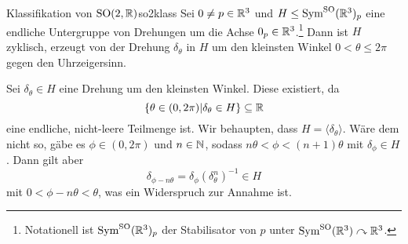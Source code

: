 \begin{lemma}{Klassifikation von $\text{SO}(2,\mathbb{R})$}{so2klass}
Sei $0 \neq p \in \mathbb{R}^3$ und $H \leq \text{Sym}^\text{SO} (\mathbb{R}^3)_p$ eine endliche Untergruppe von Drehungen um die Achse $0_p \in \mathbb{R}^3$.\footnote{Notationell ist $\text{Sym}^\text{SO} (\mathbb{R}^3)_p$ der Stabilisator von $p$ unter $\text{Sym}^\text{SO} (\mathbb{R}^3) \curvearrowright \mathbb{R}^3$.} Dann ist $H$ zyklisch, erzeugt von der Drehung $\delta_\theta$ in $H$ um den kleinsten Winkel $0<\theta \leq 2\pi$ gegen den Uhrzeigersinn.
\end{lemma}
\begin{beweis}
Sei $\delta_\theta \in H$ eine Drehung um den kleinsten Winkel. Diese existiert, da 
\begin{equation}
\{\theta \in (0,2\pi)|\delta_\theta \in H\} \subseteq \mathbb{R}
\end{equation}
eine endliche, nicht-leere Teilmenge ist. Wir behaupten, dass $H = \langle \delta_\theta \rangle$. Wäre dem nicht so, gäbe es $\phi \in (0,2\pi)$ und $n \in \mathbb{N}$, sodass $n\theta < \phi < (n+1) \theta$ mit $\delta_\phi \in H$. Dann gilt aber 
\begin{equation}
\delta_{\phi - n\theta} = \delta_\phi (\delta_\theta^n)^{-1} \in H
\end{equation}
mit $0 < \phi - n\theta < \theta$, was ein Widerspruch zur Annahme ist.
\end{beweis}
